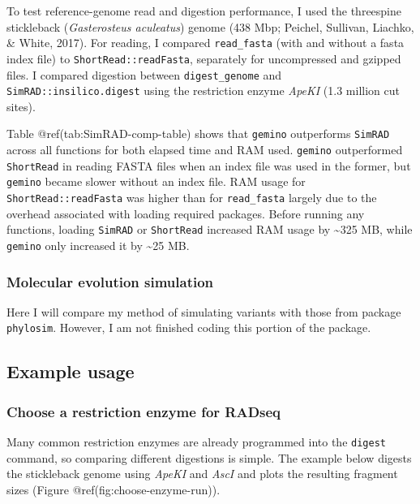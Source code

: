 \documentclass[12pt,]{article}
\begin{document}
To test reference-genome read and digestion performance, I used the
threespine stickleback (\emph{Gasterosteus aculeatus}) genome (438 Mbp;
Peichel, Sullivan, Liachko, \& White, 2017). For reading, I compared
\texttt{read\_fasta} (with and without a fasta index file) to
\texttt{ShortRead::readFasta}, separately for uncompressed and gzipped
files. I compared digestion between \texttt{digest\_genome} and
\texttt{SimRAD::insilico.digest} using the restriction enzyme
\emph{ApeKI} (1.3 million cut sites).

Table @ref(tab:SimRAD-comp-table) shows that \texttt{gemino} outperforms
\texttt{SimRAD} across all functions for both elapsed time and RAM used.
\texttt{gemino} outperformed \texttt{ShortRead} in reading FASTA files
when an index file was used in the former, but \texttt{gemino} became
slower without an index file. RAM usage for
\texttt{ShortRead::readFasta} was higher than for \texttt{read\_fasta}
largely due to the overhead associated with loading required packages.
Before running any functions, loading \texttt{SimRAD} or
\texttt{ShortRead} increased RAM usage by \textasciitilde{}325 MB, while
\texttt{gemino} only increased it by \textasciitilde{}25 MB.

\hypertarget{molecular-evolution-simulation}{%
\subsubsection{Molecular evolution
simulation}\label{molecular-evolution-simulation}}

Here I will compare my method of simulating variants with those from
package \texttt{phylosim}. However, I am not finished coding this
portion of the package.

\hypertarget{example-usage}{%
\subsection{Example usage}\label{example-usage}}

\hypertarget{choose-a-restriction-enzyme-for-radseq}{%
\subsubsection{Choose a restriction enzyme for
RADseq}\label{choose-a-restriction-enzyme-for-radseq}}

Many common restriction enzymes are already programmed into the
\texttt{digest} command, so comparing different digestions is simple.
The example below digests the stickleback genome using \emph{ApeKI} and
\emph{AscI} and plots the resulting fragment sizes (Figure
@ref(fig:choose-enzyme-run)).
\end{document}

